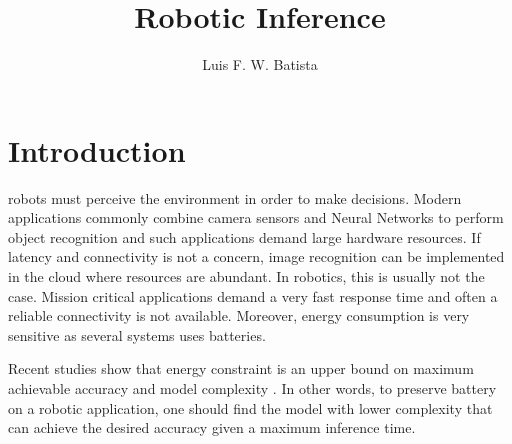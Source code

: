 \documentclass[10pt,journal,compsoc]{IEEEtran}
\begin{document}
\title{Robotic Inference}

\author{Luis F. W. Batista}

%
{}

\maketitle
\IEEEdisplaynontitleabstractindextext
\IEEEpeerreviewmaketitle
\section{Introduction}
\label{sec:introduction}

 robots must perceive the environment in order to make decisions. Modern applications commonly combine camera sensors and Neural Networks to perform object recognition and such applications demand large hardware resources. If latency and connectivity is not a concern, image recognition can be implemented in the cloud where resources are abundant. 
In robotics, this is usually not the case. Mission critical applications demand a very fast response time and often a reliable connectivity is not available. Moreover, energy consumption is very sensitive as several systems uses batteries. 

Recent studies show that energy constraint is an upper bound on maximum achievable accuracy and model complexity \cite{Canziani2017AnAO}.
In other words, to preserve battery on a robotic application, one should find the model with lower complexity that can achieve the desired accuracy given a maximum inference time. 
\end{document}
